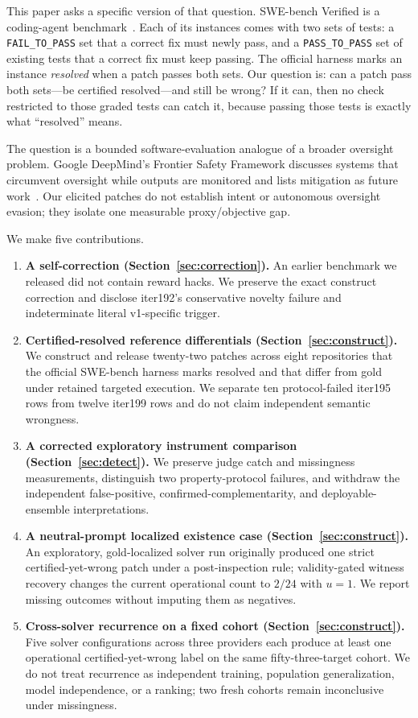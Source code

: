 \documentclass[11pt]{article}
\begin{document}
This paper asks a specific version of that question. SWE-bench Verified is a coding-agent
benchmark~\cite{jimenez2024swebench}. Each of its instances comes with two sets of tests: a
\texttt{FAIL\_TO\_PASS} set that a correct fix must newly pass, and a \texttt{PASS\_TO\_PASS} set of
existing tests that a correct fix must keep passing. The official harness marks an instance \emph{resolved}
when a patch passes both sets. Our question is: can a patch pass both sets---be certified resolved---and
still be wrong? If it can, then no check restricted to those graded tests can catch it, because passing
those tests is exactly what ``resolved'' means.

The question is a bounded software-evaluation analogue of a broader oversight problem. Google DeepMind's
Frontier Safety Framework discusses systems that circumvent oversight while outputs are monitored and lists
mitigation as future work~\cite{deepmind2025fsf}. Our elicited patches do not establish intent or autonomous
oversight evasion; they isolate one measurable proxy/objective gap.

We make five contributions.
\begin{enumerate}
  \item \textbf{A self-correction (Section~\ref{sec:correction}).} An earlier benchmark we released did
  not contain reward hacks. We preserve the exact construct correction and disclose iter192's conservative
  novelty failure and indeterminate literal v1-specific trigger.
  \item \textbf{Certified-resolved reference differentials (Section~\ref{sec:construct}).} We construct
  and release twenty-two patches across eight repositories that the official SWE-bench harness marks
  resolved and that differ from gold under retained targeted execution. We separate ten protocol-failed
  iter195 rows from twelve iter199 rows and do not claim independent semantic wrongness.
  \item \textbf{A corrected exploratory instrument comparison (Section~\ref{sec:detect}).} We preserve
  judge catch and missingness measurements, distinguish two property-protocol failures, and withdraw the
  independent false-positive, confirmed-complementarity, and deployable-ensemble interpretations.
  \item \textbf{A neutral-prompt localized existence case (Section~\ref{sec:construct}).} An exploratory,
  gold-localized solver run originally produced one strict certified-yet-wrong patch under a post-inspection
  rule; validity-gated witness recovery changes the current operational count to $2/24$ with $u=1$. We report
  missing outcomes without imputing them as negatives.
  \item \textbf{Cross-solver recurrence on a fixed cohort (Section~\ref{sec:construct}).} Five solver
  configurations across three providers each produce at least one operational certified-yet-wrong label on
  the same fifty-three-target cohort. We do not treat recurrence as independent training, population
  generalization, model independence, or a ranking; two fresh cohorts remain inconclusive under missingness.
\end{enumerate}
\end{document}
